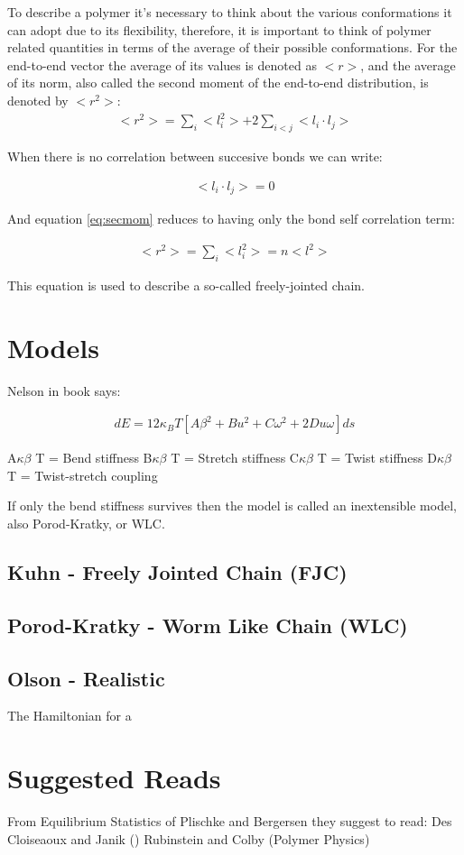 To  describe a  polymer  it's  necessary to  think  about the  various
conformations it can adopt  due to its flexibility, therefore, it
is important  to think of polymer  related quantities in  terms of the
average of their possible conformations. For the end-to-end vector the
average of  its values  is denoted  as $<r>$, and  the average  of its
norm, also called the second moment of the end-to-end distribution, is
denoted by $<r^2>$:
\begin{gather}
\label{eq:secmom}  
<r^2>=\sum_{i}<l_{i}^2> + 2\sum_{i<j}<l_{i} \cdot l_{j}>
\end{gather}  

When there is no correlation between succesive bonds we can write:

\begin{gather}
\label{eq:nocorr}
<l_{i} \cdot l_{j}> = 0
\end{gather}

And equation \ref{eq:secmom} reduces to having only the bond self
correlation term:

\begin{gather}
<r^2> = \sum_{i}<l_{i}^2> = n<l^2>
\end{gather}  

This equation is used to describe a so-called freely-jointed chain.


\section{Models}

Nelson in book says:

\begin{gather}
dE={1}{2}\kappa_{B}T[A\beta^2+Bu^2+C\omega^2+2Du\omega]ds
\end{gather}  

A$\kappa \beta$ T = Bend stiffness
B$\kappa \beta$ T = Stretch stiffness
C$\kappa \beta$ T = Twist stiffness
D$\kappa \beta$ T = Twist-stretch coupling

If only the bend stiffness survives then the model is called an
inextensible model, also Porod-Kratky, or WLC.

\subsection{Kuhn - Freely Jointed Chain (FJC)}

\subsection{Porod-Kratky - Worm Like Chain (WLC)}

\subsection{Olson - Realistic}

The Hamiltonian for a \cite{czapla2009}





\section{Suggested Reads}

From Equilibrium Statistics of Plischke and Bergersen they suggest to
read:
Des Cloiseaoux and Janik ()
Rubinstein and Colby (Polymer Physics)

